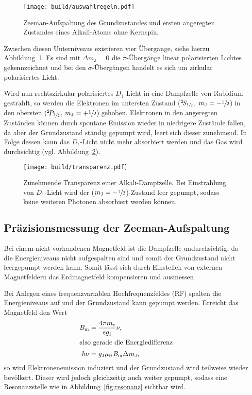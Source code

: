 \begin{figure}[ht]
  \centering
  \texttt{[image: build/auswahlregeln.pdf]}
  \caption{%
    Zeeman-Aufspaltung des Grundzustandes und ersten angeregten
  Zustandes eines Alkali-Atoms ohne Kernspin.\cite{anleitung}
  }%
  \label{fig:auswahlregeln}
\end{figure}

Zwischen diesen Unterniveaus existieren vier Übergänge, siehe hierzu
Abbildung~\ref{fig:auswahlregeln}.
Es sind mit $\Delta m_\text{J} = 0$ die $\pi$-Übergänge linear polarisierten
Lichtes gekennzeichnet und bei den $\sigma$-Übergängen handelt es sich um
zirkular polarisiertes Licht.

Wird nun rechtszirkular polarisiertes $D_1$-Licht in eine Dampfzelle von Rubidium
gestrahlt, so werden die Elektronen im untersten Zustand
(${}^2\!S_{\sfrac{1}{2}}$, $m_\text{J} = - \sfrac{1}{2}$)
in den obersten
(${}^2\!P_{\sfrac{1}{2}}$, $m_\text{J} = + \sfrac{1}{2}$)
gehoben.
Elektronen in den angeregten Zuständen können durch spontane Emission wieder
in niedrigere Zustände fallen,
da aber der Grundzustand ständig gepumpt wird,
leert sich dieser zunehmend.
In Folge dessen kann das $D_1$-Licht nicht mehr absorbiert werden und das Gas
wird durchsichtig (vgl. Abbildung~\ref{fig:transparenz}).

\begin{figure}[ht]
  \centering
  \texttt{[image: build/transparenz.pdf]}
  \caption{%
    Zunehmende Transparenz einer Alkali-Dampfzelle.\cite{anleitung}
    Bei Einstrahlung von $D_1$-Licht wird der ($m_\text{J}
    = - \sfrac{1}{2}$)-Zustand leer gepumpt, sodass keine weiteren Photonen
    absorbiert werden können.
  }
  \label{fig:transparenz}
\end{figure}




\subsection{Präzisionsmessung der Zeeman-Aufspaltung}%
\label{sub:prazisionsmessung_der_zeeman_aufspaltung}

Bei einem nicht vorhandenen Magnetfeld ist die Dampfzelle undurchsichtig,
da die Energieniveaus nicht aufgespalten sind und somit der Grundzustand nicht
leergepumpt werden kann.
Somit lässt sich durch Einstellen von externen Magnetfeldern das Erdmagnetfeld
kompensieren und ausmessen.

Bei Anlegen eines frequenzvariablen Hochfrequenzfeldes (RF) spalten die
Energieniveaus auf
und der Grundzustand kann gepumpt werden.
Erreicht das Magnetfeld den Wert
\begin{align}
	\label{eq:lande}
  B_\text{m} &= \frac{4 \pi m_e}{e g_\text{J}} \nu, \\
  \intertext{also gerade die Energiedifferenz}
  h \nu &= g_\text{J} \mu_\text{B} B_\text{m} \Delta m_\text{J},
\end{align}
so wird Elektronenemission induziert und der Grundzustand wird teilweise wieder
bevölkert.
Dieser wird jedoch gleichzeitig auch weiter gepumpt, sodass eine
Resonanzstelle wie in Abbildung~\ref{fig:resonanz} sichtbar wird.

